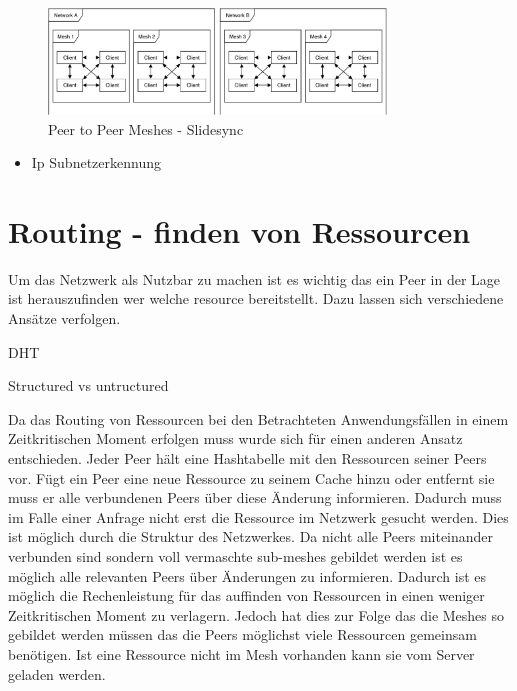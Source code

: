 \begin{figure}[!h]
	\centering
	\includegraphics[width=0.8\textwidth]{figures/slidesync_peer_meshes}
	\caption[A Figure Short-Title]{Peer to Peer Meshes - Slidesync}
	\label{fig:mesh-slidesync}
\end{figure}

\begin{itemize}
	\item Ip Subnetzerkennung
\end{itemize}
%



\section{Routing - finden von Ressourcen}

Um das \pTp Netzwerk als \cdn Nutzbar zu machen ist es wichtig das ein Peer in der Lage ist herauszufinden wer welche resource bereitstellt. Dazu lassen sich verschiedene Ansätze verfolgen.

DHT

Structured vs untructured

Da das Routing von Ressourcen bei den Betrachteten Anwendungsfällen in einem Zeitkritischen Moment erfolgen muss wurde sich für einen anderen Ansatz entschieden. Jeder Peer hält eine Hashtabelle mit den Ressourcen seiner Peers vor. Fügt ein Peer eine neue Ressource zu seinem Cache hinzu oder entfernt sie muss er alle verbundenen Peers über diese Änderung informieren. Dadurch muss im Falle einer Anfrage nicht erst die Ressource im Netzwerk gesucht werden. Dies ist möglich durch die Struktur des Netzwerkes. Da nicht alle Peers miteinander verbunden sind sondern voll vermaschte sub-meshes gebildet werden ist es möglich alle relevanten Peers über Änderungen zu informieren. Dadurch ist es möglich die Rechenleistung für das auffinden von Ressourcen in einen weniger Zeitkritischen Moment zu verlagern. Jedoch hat dies zur Folge das die Meshes so gebildet werden müssen das die Peers möglichst viele Ressourcen gemeinsam benötigen. Ist eine Ressource nicht im Mesh vorhanden kann sie vom Server geladen werden. 

